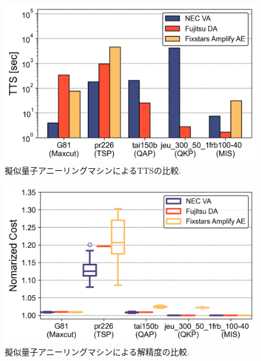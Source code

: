 \documentclass[submit,techrep,noauthor]{ipsj}
\begin{document}
\begin{figure}[tb]
\centering
\includegraphics[bb=0 0 700 230, width=15cm]{TTS_All.png}
\caption{擬似量子アニーリングマシンによるTTSの比較.}
\label{TTS_All}
\end{figure}

\begin{figure}[tb]
\centering
\includegraphics[bb=0 0 700 230, width=15cm]{Cost_All.png}
\caption{擬似量子アニーリングマシンによる解精度の比較.}
\label{Cost_All}
\end{figure}

\end{document}
